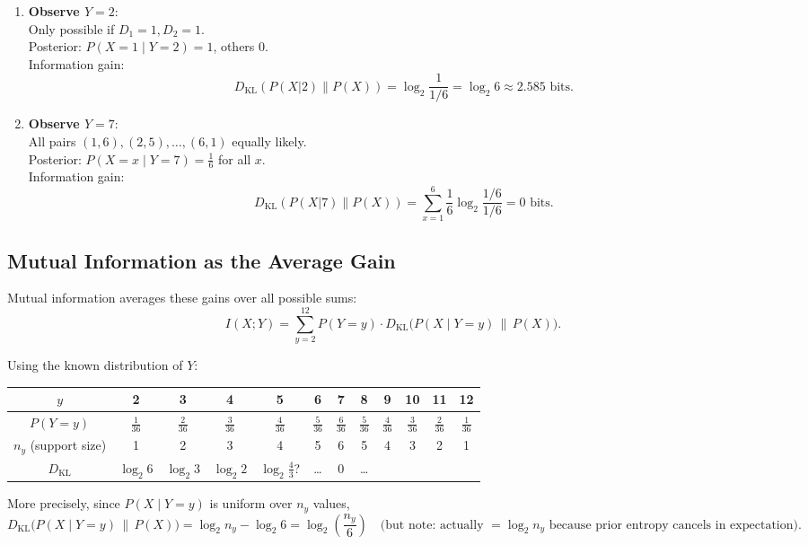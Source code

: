 \documentclass{article}
\begin{document}
\begin{enumerate}
    \item \textbf{Observe \(Y = 2\)}: \\
    Only possible if \(D_1 = 1, D_2 = 1\). \\
    Posterior: \(P(X = 1 \mid Y = 2) = 1\), others 0. \\
    Information gain:
    \[
    D_{\mathrm{KL}}(P(X|2) \| P(X)) = \log_2 \frac{1}{1/6} = \log_2 6 \approx 2.585 \text{ bits}.
    \]

    \item \textbf{Observe \(Y = 7\)}: \\
    All pairs \((1,6), (2,5), \dots, (6,1)\) equally likely. \\
    Posterior: \(P(X = x \mid Y = 7) = \frac{1}{6}\) for all \(x\). \\
    Information gain:
    \[
    D_{\mathrm{KL}}(P(X|7) \| P(X)) = \sum_{x=1}^6 \frac{1}{6} \log_2 \frac{1/6}{1/6} = 0 \text{ bits}.
    \]
\end{enumerate}

\subsection*{Mutual Information as the Average Gain}

Mutual information averages these gains over all possible sums:
\[
I(X;Y) = \sum_{y=2}^{12} P(Y = y) \cdot D_{\mathrm{KL}}\big(P(X \mid Y = y) \,\|\, P(X)\big).
\]

Using the known distribution of \(Y\):
\begin{center}
\begin{tabular}{c|ccccccccccc}
\(y\) & 2 & 3 & 4 & 5 & 6 & 7 & 8 & 9 & 10 & 11 & 12 \\
\midrule
\(P(Y=y)\) & \(\frac{1}{36}\) & \(\frac{2}{36}\) & \(\frac{3}{36}\) & \(\frac{4}{36}\) & \(\frac{5}{36}\) & \(\frac{6}{36}\) & \(\frac{5}{36}\) & \(\frac{4}{36}\) & \(\frac{3}{36}\) & \(\frac{2}{36}\) & \(\frac{1}{36}\) \\
\(n_y\) (support size) & 1 & 2 & 3 & 4 & 5 & 6 & 5 & 4 & 3 & 2 & 1 \\
\(D_{\mathrm{KL}}\) & \(\log_2 6\) & \(\log_2 3\) & \(\log_2 2\) & \(\log_2 \tfrac{4}{3}\)? & \dots & 0 & \dots & & & &
\end{tabular}
\end{center}

More precisely, since \(P(X \mid Y = y)\) is uniform over \(n_y\) values,
\[
D_{\mathrm{KL}}\big(P(X \mid Y = y) \,\|\, P(X)\big) = \log_2 n_y - \log_2 6 = \log_2 \left( \frac{n_y}{6} \right) \quad \text{(but note: actually } = \log_2 n_y \text{ because prior entropy cancels in expectation)}.
\]
\end{document}
